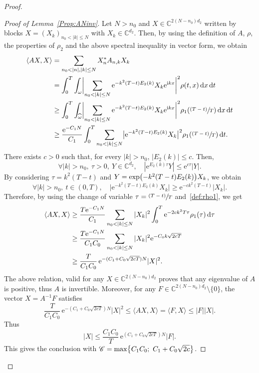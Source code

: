 \documentclass[JEP,XML,SOM,Unicode,NoEqCountersInSection]{cedram}
\let\mathcal\mathscr
\newcommand{\psfrac}[2]{\sfrac{(#1)}{#2}}
\theoremstyle{plain}
\theoremstyle{definition}
\theoremstyle{remark}
\newcommand{\diff}[1][-3]{\ensuremath{\mathop{}\mkern#1mu\mathrm{d}}}
\newcommand{\set}{\mathbb}
\renewcommand{\C}{\set{C}}
\newcommand{\eu}{\mathrm e}
\newcommand{\iu}{\mathrm i}
\let\originalleft\left
\let\originalright\right
\renewcommand{\left}{\mathopen{}\mathclose\bgroup\originalleft}
\renewcommand{\right}{\aftergroup\egroup\originalright}
\begin{document}
\begin{proof}
\begin{proof}[Proof of Lemma~\ref{Prop:ANinv}]
Let $N>n_0$ and $X \in \C^{2(N-n_0)d_2}$ written by blocks $X=(X_k)_{n_0<|k|\leq N}$ with $X_k \in \C^{d_2}$. Then, by using the definition of $A$, $\rho$, the properties of $\rho_2$ and the above spectral inequality in vector form, we obtain
\begin{align*}
\langle AX,X\rangle
& = \sum_{n_0 < |n|,|k|\leq N} X_n^* A_{n,k} X_k \\
& = \int_0^T \int_{\omega} \biggl| \sum_{n_0 < |k|\leq N}
\eu^{-k^2(T-t)E_2(k)} X_k \eu^{\iu kx} \biggr|^2 \rho(t,x) \diff x \diff t
\\ & \geq
\int_0^T \int_{\widehat{\omega}} \biggl| \sum_{n_0 < |k|\leq N}
\eu^{-k^2(T-t)E_2(k)} X_k \eu^{\iu kx} \biggr|^2 \rho_1\left(\psfrac{T-t}{T} \right) \diff x \diff t
\\ & \geq \frac{\eu^{-C_1 N}}{C_1} \int_0^T \sum_{n_0 < |k|\leq N} \bigl| \eu^{-k^2(T-t)E_2(k)} X_k \bigr|^2 \rho_1 \left(\psfrac{T-t}{T} \right) \diff t.
\end{align*}
There exists $c>0$ such that, for every $|k|>n_0$, $|E_2(k)| \leq c$. Then,
\[
\forall |k| >n_0,\ \tau>0,\ Y\in\C^{d_2},\quad | \eu^{E_2(k)\tau}Y| \leq \eu^{c \tau} |Y|.
\]
By considering $\tau=k^2(T-t)$ and $Y=\exp \left(-k^2(T-t)E_2(k)\right) X_k$, we obtain
\[
\forall |k| >n_0,\ t \in (0,T), \quad
\big| \eu^{-k^2(T-t)E_2(k)} X_k \big| \geq \eu^{-ck^2(T-t)} |X_k|.
\]
Therefore, by using the change of variable $\tau=\psfrac{T-t}{T}$ and~\eqref{def:rho1}, we get
\begin{align*}
\langle AX,X\rangle
& \geq
\frac{T \eu^{-C_1 N}}{C_1} \sum_{n_0 < |k|\leq N} | X_k |^2 \int_0^T \eu^{-2ck^2T \tau} \rho_1 \left(\tau \right) \diff \tau
\\ & \geq
\frac{T \eu^{-C_1 N}}{C_1 C_0} \sum_{n_0 < |k|\leq N} | X_k |^2 \eu^{-C_0 k\sqrt{2cT}}
\\ & \geq
\frac{T}{C_1 C_0}\, \eu^{- (C_1+C_0 \sqrt{2cT})N} | X |^2.
\end{align*}
The above relation, valid for any $X\in\C^{2(N-n_0)d_2}$ proves that any eigenvalue of $A$ is positive, thus $A$ is invertible.
Moreover, for any $F \in \C^{2(N-n_0)d_2} \setminus \{0\}$, the vector $X=A^{-1}F$ satisfies
\[
\frac{T}{C_1 C_0}\, \eu^{- (C_1+C_0 \sqrt{2cT})N} | X |^2
\leq \langle AX, X \rangle = \langle F, X \rangle \leq |F| |X|.
\]
Thus
\[
|X| \leq \frac{C_1 C_0}{T}\, \eu^{ (C_1+C_0 \sqrt{2cT})N} |F|.
\]
This gives the conclusion with
$\mathcal{C}=\max\left\{ C_1 C_0 ;\ C_1+C_0 \sqrt{2c} \right\}$.
\end{proof}


\end{proof}
\end{document}
